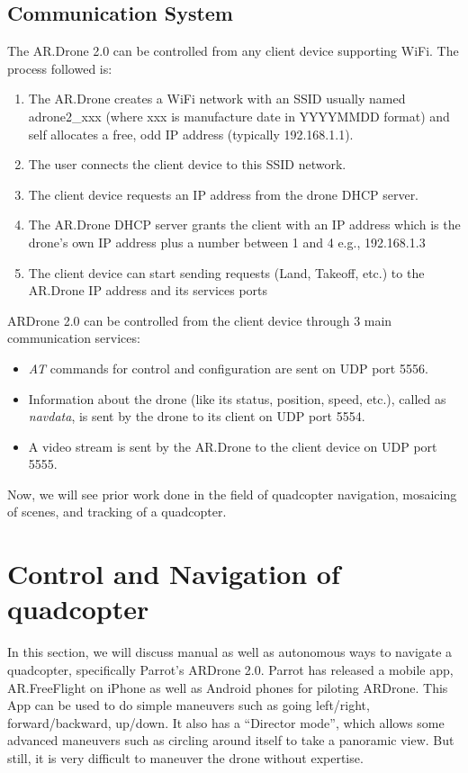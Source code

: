 \subsection{Communication System}
The AR.Drone 2.0 can be controlled from any client device supporting WiFi. The 
process followed is:
\begin{enumerate}
  \item The AR.Drone creates a WiFi network with an SSID usually named
adrone2\_xxx (where xxx is manufacture date in YYYYMMDD format) and self
allocates a free, odd IP address (typically 192.168.1.1).

   \item The user connects the client device to this SSID network.
   \item The client device requests an IP address from the drone DHCP server.
   \item The AR.Drone DHCP server grants the client with an IP address which is
   the drone's own IP address plus a number between 1 and 4 e.g., 192.168.1.3
   \item The client device can start sending requests (Land, Takeoff, etc.) to
   the AR.Drone IP address and its services ports
\end{enumerate}

ARDrone 2.0 can be controlled from the client device through 3 main communication
services: 
\begin{itemize}
\item \textit{AT} commands for control and configuration are sent on UDP
port 5556.
\item Information about the drone (like its status, position,  speed, 
etc.), called as \textit{navdata}, is sent by the drone to its client on UDP
port 5554.  
\item A video stream is sent by the AR.Drone to the client device on UDP port
5555.
\end{itemize}

Now, we will see prior work done in the field of quadcopter navigation,
mosaicing of scenes, and tracking of a quadcopter.

\section{Control and Navigation of quadcopter}
In this section, we will discuss manual as well as autonomous ways to navigate
a quadcopter, specifically Parrot's ARDrone 2.0.
Parrot has released a mobile app, AR.FreeFlight on iPhone as well as Android
phones for piloting ARDrone. This App can be used to do simple maneuvers such
as going left/right, forward/backward, up/down. It also has a ``Director mode'',
which allows some advanced maneuvers such as circling around itself to take
a panoramic view. But still, it is very difficult to maneuver the drone without
expertise.

